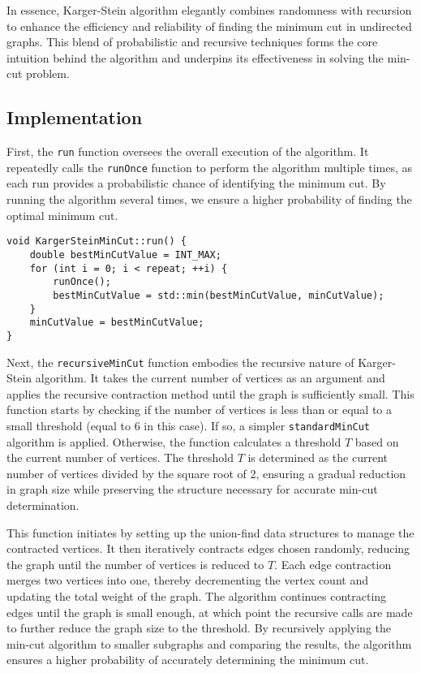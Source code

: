     In essence, Karger-Stein algorithm elegantly combines randomness with recursion to enhance the efficiency and reliability of finding the minimum cut in undirected graphs. This blend of probabilistic and recursive techniques forms the core intuition behind the algorithm and underpins its effectiveness in solving the min-cut problem.



\subsection{Implementation}
First, the \texttt{run} function oversees the overall execution of the algorithm. It repeatedly calls the \texttt{runOnce} function to perform the algorithm multiple times, as each run provides a probabilistic chance of identifying the minimum cut. By running the algorithm several times, we ensure a higher probability of finding the optimal minimum cut.

\begin{verbatim}
void KargerSteinMinCut::run() {
    double bestMinCutValue = INT_MAX;
    for (int i = 0; i < repeat; ++i) {
        runOnce();
        bestMinCutValue = std::min(bestMinCutValue, minCutValue);
    }
    minCutValue = bestMinCutValue;
}
\end{verbatim}

Next, the \texttt{recursiveMinCut} function embodies the recursive nature of Karger-Stein algorithm. It takes the current number of vertices as an argument and applies the recursive contraction method until the graph is sufficiently small. This function starts by checking if the number of vertices is less than or equal to a small threshold (equal to 6 in this case). If so, a simpler \texttt{standardMinCut} algorithm is applied. Otherwise, the function calculates a threshold \( T \) based on the current number of vertices. The threshold \( T \) is determined as the current number of vertices divided by the square root of 2, ensuring a gradual reduction in graph size while preserving the structure necessary for accurate min-cut determination.

This function initiates by setting up the union-find data structures to manage the contracted vertices. It then iteratively contracts edges chosen randomly, reducing the graph until the number of vertices is reduced to \( T \). Each edge contraction merges two vertices into one, thereby decrementing the vertex count and updating the total weight of the graph. The algorithm continues contracting edges until the graph is small enough, at which point the recursive calls are made to further reduce the graph size to the threshold. By recursively applying the min-cut algorithm to smaller subgraphs and comparing the results, the algorithm ensures a higher probability of accurately determining the minimum cut.


